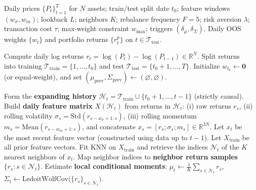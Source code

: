 \documentclass[11pt]{article}
\begin{document}
\begin{algorithm}[H]
\caption{KNN + MVO}
\label{alg:knn_mvo_weekly_trigger}
\begin{algorithmic}[1]
\Require
Daily prices $\{P_t\}_{t=1}^T$ for $N$ assets; train/test split date $t_0$; feature windows $(w_{\sigma},w_m)$; lookback $L$; neighbors $K$; rebalance frequency $F{=}5$; risk aversion $\lambda$; transaction cost $\tau$; max-weight constraint $w_{\max}$; triggers $(\delta_\mu,\delta_\Sigma)$.
\Ensure
Daily OOS weights $\{w_t\}$ and portfolio returns $\{r^{p}_t\}$ on $t\in\mathcal{T}_{\text{test}}$.

\State Compute daily log returns $r_t=\log(P_t)-\log(P_{t-1}) \in \mathbb{R}^N$.
\State Split returns into training $\mathcal{T}_{\text{train}}=\{1,\dots,t_0\}$ and test $\mathcal{T}_{\text{test}}=\{t_0+1,\dots,T\}$.
\State Initialize $w_{t_0} \leftarrow \mathbf{0}$ (or equal-weight), and set $(\mu_{\text{prev}},\Sigma_{\text{prev}})\leftarrow (\varnothing,\varnothing)$.

\vspace{0.25em}
    \State Form the \textbf{expanding history} $\mathcal{H}_t = \mathcal{T}_{\text{train}} \cup \{t_0+1,\dots,t-1\}$ (strictly causal).
    \State Build \textbf{daily feature matrix} $X(\mathcal{H}_t)$ from returns in $\mathcal{H}_t$:
        \Statex \hspace{1.5em} (i) raw returns $r_s$,
        \Statex \hspace{1.5em} (ii) rolling volatility $\sigma_s=\mathrm{Std}(r_{s-w_{\sigma}+1:s})$,
        \Statex \hspace{1.5em} (iii) rolling momentum $m_s=\mathrm{Mean}(r_{s-w_{m}+1:s})$,
        \Statex \hspace{1.5em} and concatenate $x_s = [r_s;\sigma_s;m_s] \in \mathbb{R}^{3N}$.
    \State Let $x_t$ be the most recent feature vector (constructed using data up to $t-1$). Let $X_{\text{train}}$ be all prior feature vectors.
    \State Fit KNN on $X_{\text{train}}$ and retrieve the indices $\mathcal{N}_t$ of the $K$ nearest neighbors of $x_t$.
    \State Map neighbor indices to \textbf{neighbor return samples} $\{r_s : s \in \mathcal{N}_t\}$.
    \State Estimate \textbf{local conditional moments}:
        \Statex \hspace{1.5em} $\mu_t \leftarrow \frac{1}{K}\sum_{s\in \mathcal{N}_t} r_s$, \quad
        \Statex \hspace{1.5em} $\Sigma_t \leftarrow \text{LedoitWolfCov}\big(\{r_s\}_{s\in\mathcal{N}_t}\big)$.


\end{algorithmic}
\end{algorithm}
\end{document}
